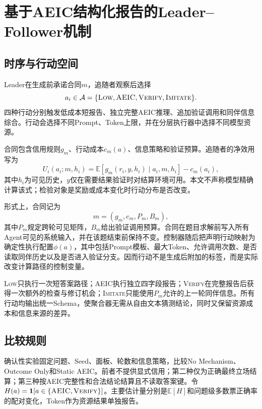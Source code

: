 \section{基于AEIC结构化报告的Leader--Follower机制}\label{sec:game}
\subsection{时序与行动空间}
Leader在生成前承诺合同$m$，追随者观察后选择
\begin{equation}a_i\in\mathcal{A}=\{\textsc{Low},\textsc{AEIC},\textsc{Verify},\textsc{Imitate}\}.\end{equation}
四种行动分别触发低成本短报告、独立完整AEIC推理、追加验证调用和同伴信息综合。行动会选择不同Prompt、Token上限，并在分层执行器中选择不同模型资源。

合同包含信用规则$g_m$、行动成本$c_m(a)$、信息策略和验证预算。追随者的净效用写为
\begin{equation}U_i(a_i;m,h_i)=\mathbb{E}[g_m(r_i,y,h_i)\mid a_i,m,h_i]-c_m(a_i),\label{eq:followerutility}\end{equation}
其中$h_i$为可见历史，$y$仅在需要结果验证时对结算环境可用。本文不声称模型精确计算该式；检验对象是奖励或成本变化时行动分布是否改变。

形式上，合同记为
\begin{equation}
m=(g_m,c_m,P_m,B_m),
\end{equation}
其中$P_m$规定跨轮可见矩阵，$B_m$给出验证调用预算。合同在题目求解前写入所有Agent可见的系统输入，并在该题结束前保持不变。控制器随后把声明行动映射为确定性执行配置$\phi(a)$，其中包括Prompt模板、最大Token、允许调用次数、是否读取同伴历史以及是否进入验证分支。因而行动不是生成后附加的标签，而是实际改变计算路径的控制变量。

\textsc{Low}只执行一次短答案路径；\textsc{AEIC}执行独立四字段报告；\textsc{Verify}在完整报告后获得一次额外的检查与修订机会；\textsc{Imitate}只能使用$P_m$允许的上一轮同伴信息。所有行动均输出统一Schema，使聚合器无需从自由文本猜测结论，同时又保留资源成本和信息来源的差异。

\subsection{比较规则}
确认性实验固定问题、Seed、面板、轮数和信息策略，比较No Mechanism、Outcome Only和Static AEIC。前者不提供显式信用；第二种仅为正确最终立场结算；第三种按AEIC完整性和合法结论结算且不读取答案键。令$H(a)=\mathbf{1}[a\in\{\textsc{AEIC},\textsc{Verify}\}]$。主要估计量分别是$\mathbb{E}[H]$和问题级多数票正确率的配对变化，Token作为资源结果单独报告。


